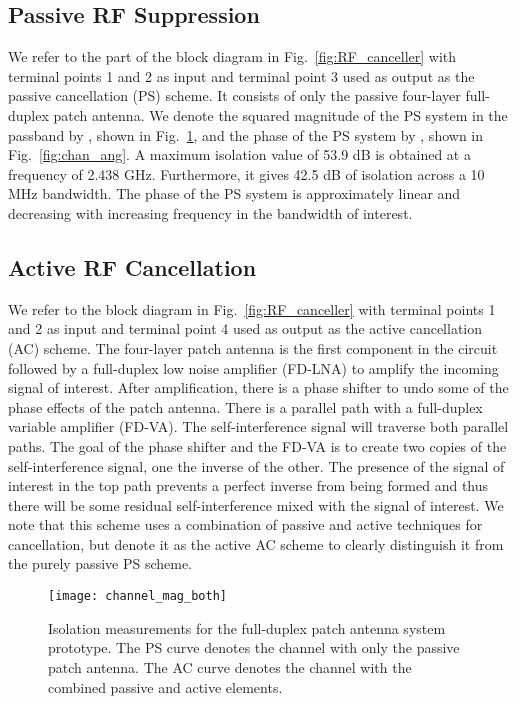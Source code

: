 \documentclass[12pt, journal,draftcls,letterpaper,onecolumn]{IEEEtran}
\begin{document}
\subsection{Passive RF Suppression}
We refer to the part of the block diagram in Fig.~\ref{fig:RF_canceller} with terminal points 1 and 2 as input and terminal point 3 used as output as the passive cancellation (PS) scheme.  It consists of only the passive four-layer full-duplex patch antenna.  We denote the squared magnitude of the PS system in the passband by , shown in Fig.~\ref{fig:chan_mag}, and the phase of the PS system by , shown in Fig.~\ref{fig:chan_ang}. A maximum isolation value of 53.9 dB is obtained at a frequency of  2.438 GHz.  Furthermore, it gives 42.5 dB of isolation across a 10 MHz bandwidth.  The phase of the PS system is approximately linear and decreasing with increasing frequency in the bandwidth of interest. 

\subsection{Active RF Cancellation}
We refer to the block diagram in Fig.~\ref{fig:RF_canceller} with terminal points 1 and 2 as input and terminal point 4 used as output as the active cancellation (AC) scheme.  The four-layer patch antenna is the first component in the circuit followed by a full-duplex low noise amplifier (FD-LNA) to amplify the incoming signal of interest.  After amplification, there is a phase shifter to undo some of the phase effects of the patch antenna.  There is a parallel path with a full-duplex variable amplifier (FD-VA).  The self-interference signal  will traverse both parallel paths.  The goal of the phase shifter and the FD-VA is to create two copies of the self-interference signal, one the inverse of the other.  The presence of the signal of interest in the top path prevents a perfect inverse from being formed and thus there will be some residual self-interference mixed with the signal of interest.  We note that this scheme uses a combination of passive and active techniques for cancellation, but denote it as the active AC scheme to clearly distinguish it from the purely passive PS scheme.  
\begin{figure}[htp]
\begin{center} 
  \texttt{[image: channel\_mag\_both]}
\caption[fig:chan_mag]{Isolation measurements for the full-duplex patch antenna system prototype.  The PS curve denotes the channel with only the passive patch antenna.  The AC curve denotes the channel with the combined passive and active elements.} 
  \label{fig:chan_mag} 
\end{center} 
\end{figure} 
\end{document}
